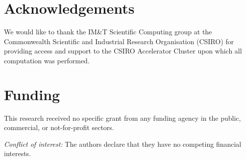 \documentclass{article}
\begin{document}
\section*{Acknowledgements}
We would like to thank the IM\&T Scientific Computing group at the Commonwealth Scientific and Industrial Research Organisation (CSIRO) for providing access and support to the CSIRO Accelerator Cluster upon which all computation was performed. 



\section*{Funding}
This research received no specific grant from any funding agency in the public, commercial, or not-for-profit sectors.

\vspace{1cm}
\noindent
{\em Conflict of interest:} The authors declare that they have no
competing financial interests.





  
 



\end{document}
